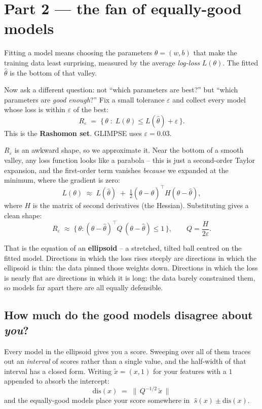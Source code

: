 \documentclass[11pt]{article}
\begin{document}
\section{Part 2 --- the fan of equally-good models}

Fitting a model means choosing the parameters $\theta = (w, b)$ that make the
training data least surprising, measured by the average \emph{log-loss} $L(\theta)$.
The fitted $\hat\theta$ is the bottom of that valley.

Now ask a different question: not ``which parameters are best?'' but ``which parameters
are \emph{good enough}?'' Fix a small tolerance $\varepsilon$ and collect every model
whose loss is within $\varepsilon$ of the best:
\[
  R_\varepsilon \;=\; \{\, \theta \;:\; L(\theta) \le L(\hat\theta) + \varepsilon \,\}.
\]
This is the \textbf{Rashomon set}. GLIMPSE uses $\varepsilon = 0.03$.

$R_\varepsilon$ is an awkward shape, so we approximate it. Near the bottom of a smooth
valley, any loss function looks like a parabola -- this is just a second-order Taylor
expansion, and the first-order term vanishes \emph{because} we expanded at the minimum,
where the gradient is zero:
\[
  L(\theta) \;\approx\; L(\hat\theta)
  \;+\; \tfrac{1}{2}(\theta - \hat\theta)^\top H (\theta - \hat\theta),
\]
where $H$ is the matrix of second derivatives (the Hessian). Substituting gives a clean
shape:
\[
  R_\varepsilon \;\approx\;
  \big\{\, \theta : (\theta-\hat\theta)^\top Q\, (\theta-\hat\theta) \le 1 \,\big\},
  \qquad Q = \frac{H}{2\varepsilon}.
\]

That is the equation of an \textbf{ellipsoid} -- a stretched, tilted ball centred on
the fitted model. Directions in which the loss rises steeply are directions in which
the ellipsoid is thin: the data pinned those weights down. Directions in which the loss
is nearly flat are directions in which it is long: the data barely constrained them,
so models far apart there are all equally defensible.

\subsection*{How much do the good models disagree about \emph{you}?}

Every model in the ellipsoid gives you a score. Sweeping over all of them traces out an
\emph{interval} of scores rather than a single value, and the half-width of that
interval has a closed form. Writing $\tilde{x} = (x, 1)$ for your features with a $1$
appended to absorb the intercept:
\[
  \boxed{\;
  \mathrm{dis}(x) \;=\; \big\| \, Q^{-1/2}\, \tilde{x} \, \big\|
  \;}
\]
and the equally-good models place your score somewhere in
$\;\hat{s}(x) \pm \mathrm{dis}(x)$.
\end{document}
